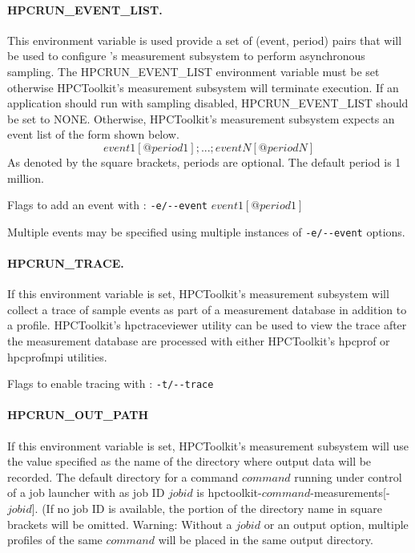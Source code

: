 \paragraph{HPCRUN\_EVENT\_LIST.}

This environment variable is used provide a set of (event, period)
pairs that will be used to configure \HPCToolkit's measurement subsystem to perform
asynchronous sampling.  The HPCRUN\_EVENT\_LIST environment variable
must be set otherwise HPCToolkit's measurement subsystem will terminate
execution. If an application should run with sampling disabled,
HPCRUN\_EVENT\_LIST should be set to NONE. Otherwise, HPCToolkit's
measurement subsystem expects an event list of the form shown below.
$$event1[@period1];...;eventN[@periodN]$$ As denoted by the
square brackets, periods are optional. The default period is 1
million.

\parg
Flags to add an event with \hpcrun: \verb|-e/--event| $event1[@period1]$

\parg
Multiple events may be specified using multiple instances of \verb|-e/--event| options.

\paragraph{HPCRUN\_TRACE.}

If this environment variable is set, HPCToolkit's measurement
subsystem will collect a trace of sample events as part of a measurement
database in addition to a profile. HPCToolkit's hpctraceviewer
utility can be used to view the trace after the measurement database
are processed with either HPCToolkit's hpcprof or hpcprofmpi
utilities.

\parg
Flags to enable tracing with \hpcrun: \verb|-t/--trace|

\paragraph{HPCRUN\_OUT\_PATH}

If this environment variable is set, HPCToolkit's measurement subsystem
will use the value specified as the name of the directory where
output data will be recorded. The default directory for a command
$command$ running under control of a job launcher with as job ID
$jobid$ is hpctoolkit-$command$-measurements[-$jobid$]. (If no
job ID is available, the portion of the directory name in square
brackets will be omitted. Warning: Without a $jobid$ or an output
option, multiple profiles of the same $command$ will be placed
in the same output directory.

